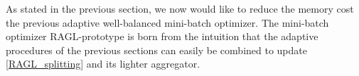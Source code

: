 
%		
%		
%		
%		
%		
%		
%		
%		


As stated in the previous section, we now would like to reduce the memory cost the previous adaptive well-balanced mini-batch optimizer. 
The mini-batch optimizer RAGL-prototype is born from the intuition
that the adaptive procedures of the previous sections can easily be combined to 
 update \eqref{RAGL_splitting} and its lighter aggregator.


